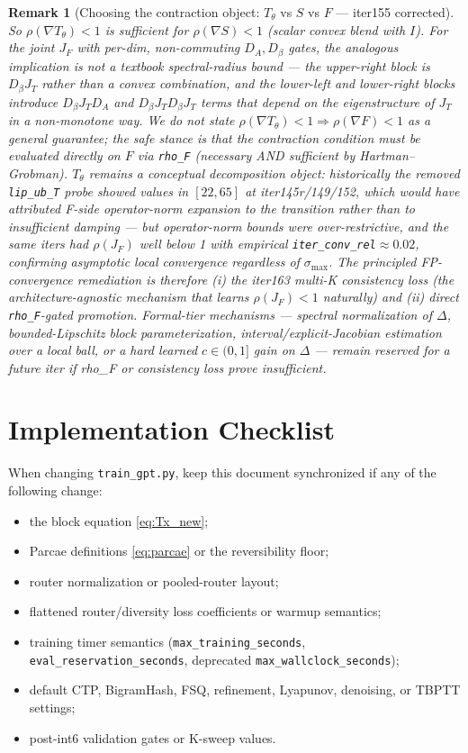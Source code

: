 \documentclass[11pt]{article}
\newtheorem{remark}[theorem]{Remark}
\begin{document}
\begin{remark}[Choosing the contraction object: $T_\theta$ vs $S$ vs $F$ — iter155 corrected]
So $\rho(\nabla T_\theta) < 1$ \emph{is} sufficient for $\rho(\nabla S) < 1$
(scalar convex blend with $I$).  For the joint $J_F$ with per-dim,
non-commuting $D_A, D_\beta$ gates, the analogous implication is
\emph{not} a textbook spectral-radius bound — the upper-right block is
$D_\beta J_T$ rather than a convex combination, and the lower-left and
lower-right blocks introduce $D_\beta J_T D_A$ and $D_\beta J_T D_\beta J_T$
terms that depend on the eigenstructure of $J_T$ in a non-monotone way.
We do not state $\rho(\nabla T_\theta)<1 \Rightarrow \rho(\nabla F)<1$ as
a general guarantee; the safe stance is that the contraction condition
must be evaluated directly on $F$ via \texttt{rho\_F} (necessary AND
sufficient by Hartman--Grobman).  $T_\theta$ remains a conceptual
decomposition object: historically the removed \texttt{lip\_ub\_T} probe
showed values in $[22,65]$ at iter145r/149/152, which would have
attributed F-side operator-norm expansion to the transition rather than
to insufficient damping — but operator-norm bounds were over-restrictive,
and the same iters had $\rho(J_F)$ well below 1 with empirical
\texttt{iter\_conv\_rel}$\approx 0.02$, confirming asymptotic local
convergence regardless of $\sigma_{\max}$.
The principled FP-convergence remediation is therefore (i) the iter163
multi-K consistency loss (the architecture-agnostic mechanism that
\emph{learns} $\rho(J_F)<1$ naturally) and (ii) direct
\texttt{rho\_F}-gated promotion.  Formal-tier mechanisms — spectral
normalization of $\Delta$, bounded-Lipschitz block parameterization,
interval/explicit-Jacobian estimation over a local ball, or a hard
learned $c\in(0,1]$ gain on $\Delta$ — remain reserved for a future
iter if rho\_F or consistency loss prove insufficient.
\end{remark}

\appendix

\section{Implementation Checklist}
\label{app:checklist}

When changing \texttt{train\_gpt.py}, keep this document synchronized if any of
the following change:
\begin{itemize}[leftmargin=2em,itemsep=0.2em]
  \item the block equation \eqref{eq:Tx_new};
  \item Parcae definitions \eqref{eq:parcae} or the reversibility floor;
  \item router normalization or pooled-router layout;
  \item flattened router/diversity loss coefficients or warmup semantics;
  \item training timer semantics
        (\texttt{max\_training\_seconds}, \texttt{eval\_reservation\_seconds},
        deprecated \texttt{max\_wallclock\_seconds});
  \item default CTP, BigramHash, FSQ, refinement, Lyapunov, denoising, or
        TBPTT settings;
  \item post-int6 validation gates or K-sweep values.
\end{itemize}
\end{document}
